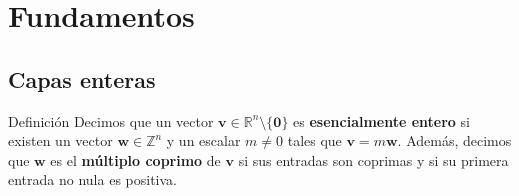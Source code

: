 \documentclass[aspectratio=169,professionalfonts]{beamer}
\newcommand{\Z}{\mathbb{Z}}
\newcommand{\R}{\mathbb{R}}
\renewcommand{\vec}[1]{\boldsymbol{#1}}
\newcommand{\braces}[1]{\lbrace #1 \rbrace}
\begin{document}



\section{Fundamentos}

\subsection{Capas enteras}
\begin{frame}
	\begin{block}{Definición}
		Decimos que un vector $\vec{v} \in \R^n \setminus \braces{\vec{0}}$ es
		\textbf{esencialmente entero} si existen un vector $\vec{w} \in \Z^n$ y
		un escalar $m \neq 0$ tales que $\vec{v} = m\vec{w}$. Además, decimos
		que $\vec{w}$ es el \textbf{múltiplo coprimo} de $\vec{v}$ si sus
		entradas son coprimas y si su primera entrada no nula es positiva.
	\end{block}
\end{frame}
\end{document}
